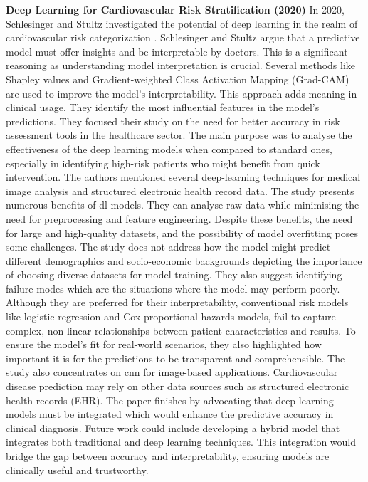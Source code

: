 \noindent \textbf{Deep Learning for Cardiovascular Risk Stratification (2020)}
In 2020, Schlesinger and Stultz investigated the potential of deep learning in the realm of cardiovascular risk categorization \citep{schlesinger2020deep}. Schlesinger and Stultz argue that a predictive model must offer insights and be interpretable by doctors. This is a significant reasoning as understanding model interpretation is crucial. Several methods like Shapley values and Gradient-weighted Class Activation Mapping (Grad-CAM) are used to improve the model’s interpretability. This approach adds meaning in clinical usage. They identify the most influential features in the model’s predictions. They focused their study on the need for better accuracy in risk assessment tools in the healthcare sector. The main purpose was to analyse the effectiveness of the deep learning models when compared to standard ones, especially in identifying high-risk patients who might benefit from quick intervention. The authors mentioned several deep-learning techniques for medical image analysis and structured electronic health record data. The study presents numerous benefits of \gls{dl} models. They can analyse raw data while minimising the need for preprocessing and feature engineering. Despite these benefits, the need for large and high-quality datasets, and the possibility of model overfitting poses some challenges. The study does not address how the model might predict different demographics and socio-economic backgrounds depicting the importance of choosing diverse datasets for model training. They also suggest identifying failure modes which are the situations where the model may perform poorly. \\ Although they are preferred for their interpretability, conventional risk models like logistic regression and Cox proportional hazards models, fail to capture complex, non-linear relationships between patient characteristics and results. To ensure the model's fit for real-world scenarios, they also highlighted how important it is for the predictions to be transparent and comprehensible. The study also concentrates on \gls{cnn} for image-based applications. Cardiovascular disease prediction may rely on other data sources such as structured electronic health records (EHR). The paper finishes by advocating that deep learning models must be integrated which would enhance the predictive accuracy in clinical diagnosis. Future work could include developing a hybrid model that integrates both traditional and deep learning techniques. This integration would bridge the gap between accuracy and interpretability, ensuring models are clinically useful and trustworthy. 
\vspace{0.5 cm}

